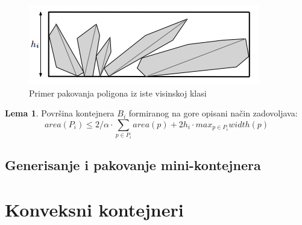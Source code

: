 \documentclass[a4paper]{article}
\theoremstyle{plain}
\theoremstyle{definition}
\newtheorem{lem}[thm]{Lema} %
\begin{document}
\begin{figure}[H]
    \centering
    \includegraphics[scale=0.8]{resources/fig1.PNG}
    \caption{Primer pakovanja poligona iz iste visinskoj klasi}
    \label{fig1}
\end{figure}

\begin{lem}
    Povr\v{s}ina kontejnera $B_{i}$ formiranog na gore opisani na\v{c}in zadovoljava: $$area(P_{i}) \leq 2/\alpha \cdot \sum_{p \in P_{i}}{area(p) + 2h_{i} \cdot max_{p \in P_{i}}{width(p)}}$$
\end{lem}

\subsection{Generisanje i pakovanje mini-kontejnera}
\label{subsec:Korak2}


\section{Konveksni kontejneri}
\label{sec:Konveksni}


\appendix



\end{document}
